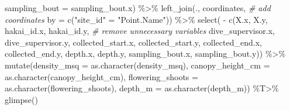 \documentclass[
]{book}
\newenvironment{Shaded}{\begin{snugshade}}{\end{snugshade}}
\newcommand{\AttributeTok}[1]{\textcolor[rgb]{0.77,0.63,0.00}{#1}}
\newcommand{\CommentTok}[1]{\textcolor[rgb]{0.56,0.35,0.01}{\textit{#1}}}
\newcommand{\FunctionTok}[1]{\textcolor[rgb]{0.00,0.00,0.00}{#1}}
\newcommand{\NormalTok}[1]{#1}
\newcommand{\OtherTok}[1]{\textcolor[rgb]{0.56,0.35,0.01}{#1}}
\newcommand{\SpecialCharTok}[1]{\textcolor[rgb]{0.00,0.00,0.00}{#1}}
\newcommand{\StringTok}[1]{\textcolor[rgb]{0.31,0.60,0.02}{#1}}
\begin{document}
\begin{Shaded}
\begin{Highlighting}[]
         \AttributeTok{sampling\_bout   =}\NormalTok{ sampling\_bout.x) }\SpecialCharTok{\%\textgreater{}\%}
  \FunctionTok{left\_join}\NormalTok{(., coordinates,  }\CommentTok{\# add coordinates}
            \AttributeTok{by =} \FunctionTok{c}\NormalTok{(}\StringTok{"site\_id"} \OtherTok{=} \StringTok{"Point.Name"}\NormalTok{)) }\SpecialCharTok{\%\textgreater{}\%}
  \FunctionTok{select}\NormalTok{( }\SpecialCharTok{{-}} \FunctionTok{c}\NormalTok{(X.x, X.y, hakai\_id.x, hakai\_id.y,  }\CommentTok{\# remove unnecessary variables}
\NormalTok{              dive\_supervisor.x, dive\_supervisor.y,}
\NormalTok{              collected\_start.x, collected\_start.y,}
\NormalTok{              collected\_end.x, collected\_end.y,}
\NormalTok{              depth.x, depth.y,}
\NormalTok{              sampling\_bout.x, sampling\_bout.y)) }\SpecialCharTok{\%\textgreater{}\%}
  \FunctionTok{mutate}\NormalTok{(}\AttributeTok{density\_msq =} \FunctionTok{as.character}\NormalTok{(density\_msq),}
         \AttributeTok{canopy\_height\_cm =} \FunctionTok{as.character}\NormalTok{(canopy\_height\_cm),}
         \AttributeTok{flowering\_shoots =} \FunctionTok{as.character}\NormalTok{(flowering\_shoots),}
         \AttributeTok{depth\_m =} \FunctionTok{as.character}\NormalTok{(depth\_m)) }\SpecialCharTok{\%T\textgreater{}\%}
  \FunctionTok{glimpse}\NormalTok{()}
\end{Highlighting}
\end{Shaded}
\end{document}
